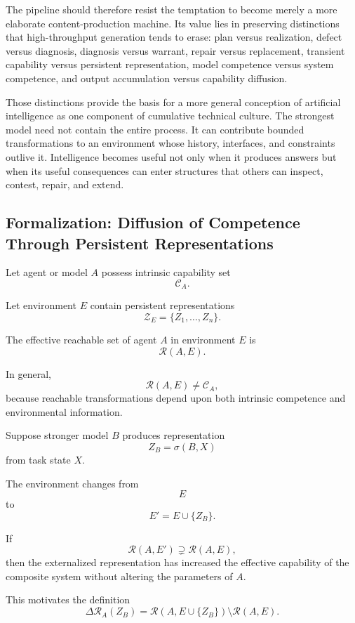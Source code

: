 \documentclass[11pt]{article}
\begin{document}
The pipeline should therefore resist the temptation to become merely a more elaborate content-production machine. Its value lies in preserving distinctions that high-throughput generation tends to erase: plan versus realization, defect versus diagnosis, diagnosis versus warrant, repair versus replacement, transient capability versus persistent representation, model competence versus system competence, and output accumulation versus capability diffusion.

Those distinctions provide the basis for a more general conception of artificial intelligence as one component of cumulative technical culture. The strongest model need not contain the entire process. It can contribute bounded transformations to an environment whose history, interfaces, and constraints outlive it. Intelligence becomes useful not only when it produces answers but when its useful consequences can enter structures that others can inspect, contest, repair, and extend.

\subsection{Formalization: Diffusion of Competence Through Persistent Representations}

Let agent or model \(A\) possess intrinsic capability set
\[
    \mathcal{C}_A.
\]

Let environment \(E\) contain persistent representations
\[
    \mathcal{Z}_E
    =
    \{Z_1,\ldots,Z_n\}.
\]

The effective reachable set of agent \(A\) in environment \(E\) is
\[
    \mathcal{R}(A,E).
\]

In general,
\[
    \mathcal{R}(A,E)
    \neq
    \mathcal{C}_A,
\]
because reachable transformations depend upon both intrinsic competence and environmental information.

Suppose stronger model \(B\) produces representation
\[
    Z_B
    =
    \sigma(B,X)
\]
from task state \(X\).

The environment changes from
\[
    E
\]
to
\[
    E'
    =
    E\cup\{Z_B\}.
\]

If
\[
    \mathcal{R}(A,E')
    \supsetneq
    \mathcal{R}(A,E),
\]
then the externalized representation has increased the effective capability of the composite system without altering the parameters of \(A\).

This motivates the definition
\[
    \Delta\mathcal{R}_A(Z_B)
    =
    \mathcal{R}(A,E\cup\{Z_B\})
    \setminus
    \mathcal{R}(A,E).
\]
\end{document}
